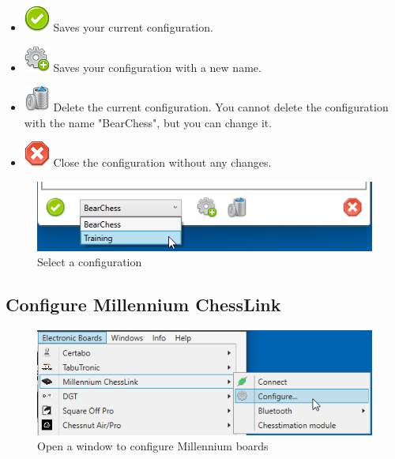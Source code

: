 \documentclass[11pt,a4paper]{article}
\begin{document}
\begin{itemize}
	\item \includegraphics[scale=0.3]{accept_button.png} Saves your current configuration.
    \item \includegraphics[scale=0.3]{cog_add.png} Saves your configuration with a new name.
    \item \includegraphics[scale=0.3]{bin.png} Delete the current configuration. You cannot delete the configuration with the name "BearChess", but you can change it.
    \item \includegraphics[scale=0.3]{cancel.png} Close the configuration without any changes.
\end{itemize}


\begin{figure}[H]
	\centering
	\includegraphics[scale=1.0]{iChessOne8.png}
	\caption{Select a configuration}
	\label{fig:iChessOne11}
\end{figure}

\subsection{Configure Millennium ChessLink} \label{ConfigureChessLink}
\begin{figure}[H]
	\centering
	\includegraphics[scale=1.0]{MillenniumChessLink1.png}
	\caption{Open a window to configure Millennium boards }
	\label{fig:MillenniumChessLink1}
\end{figure}
\end{document}
